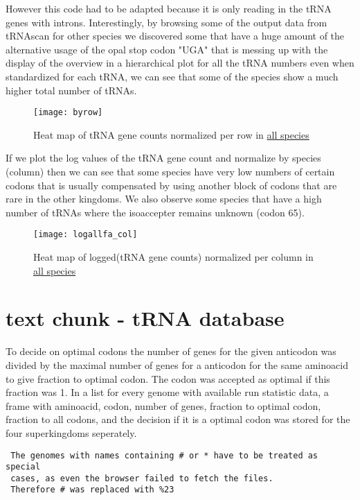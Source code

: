 However this code had to be adapted because it is only reading in the tRNA genes with introns. Interestingly, by browsing some of the output data from tRNAscan for other species we discovered some that have a huge amount of the alternative usage of the opal stop codon "UGA" that is messing up with the display of the overview in a hierarchical plot for all the tRNA numbers even when standardized for each tRNA, we can see that some of the species show a much higher total number of tRNAs. 

\begin{figure}[tb] 
\centering 
\texttt{[image: byrow]} 
\caption[Heat map for tRNA counts]{Heat map of tRNA gene counts normalized per row in \hyperlink{data:veab}{all species}}
\label{fig:byrow} 
\end{figure}

If we plot the log values of the tRNA gene count and normalize by species (column) then we can see that some species have very low numbers of certain codons that is usually compensated by using another block of codons that are rare in the other kingdoms. We also observe some species that have a high number of tRNAs where the isoaccepter remains unknown (codon 65).


\begin{figure}[tb] 
\centering 
\texttt{[image: logallfa\_col]} 
\caption[Heat map for log(tRNA counts)]{Heat map of logged(tRNA gene counts) normalized per column in \hyperlink{data:veab}{all species}}
\label{fig:bycol} 
\end{figure}


\section{text chunk - tRNA database}


To decide on optimal codons the number of genes for the given anticodon was divided by the maximal number of genes for a anticodon for the same aminoacid to give fraction to optimal codon. The codon was accepted as optimal if this fraction was 1. In a list for every genome with available run statistic data, a frame with aminoacid, codon, number of genes, fraction to optimal codon, fraction to all codons, and the decision if it is a optimal codon was stored for the four superkingdoms seperately.
 
\begin{verbatim}
 The genomes with names containing # or * have to be treated as special 
 cases, as even the browser failed to fetch the files. 
 Therefore # was replaced with %23
\end{verbatim}

